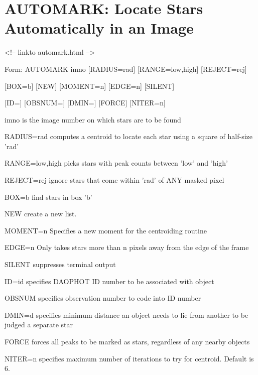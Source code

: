 \section{AUTOMARK: Locate Stars Automatically in an Image}
\begin{rawhtml}
<!-- linkto automark.html -->
\end{rawhtml}
\begin{command}
  \item[Form: AUTOMARK imno {[RADIUS=rad]} {[RANGE=low,high]} {[REJECT=rej]}\hfill]{}
  \item{{[BOX=b]} {[NEW]} {[MOMENT=n]} {[EDGE=n]} {[SILENT]}}
  \item{{[ID=]} {[OBSNUM=]} {[DMIN=]} {[FORCE]} {[NITER=n]}}
  \item[imno]{is the image number on which stars are
to be found}
  \item[RADIUS=rad]{computes a centroid to locate each star
using a square of half-size 'rad'}
  \item[RANGE=low,high]{picks stars with peak counts between 'low' and 'high'}
  \item[REJECT=rej]{ignore stars that come within 'rad' of
ANY masked pixel}
  \item[BOX=b]{find stars in box 'b'}
  \item[NEW]{create a new list.}
  \item[MOMENT=n]{Specifies a new moment for the centroiding routine}
  \item[EDGE=n]{Only takes stars more than n pixels away from the edge of the frame}
  \item[SILENT ]{suppresses terminal output}
  \item[ID=id]{specifies DAOPHOT ID number to be associated with object}
  \item[OBSNUM]{specifies observation number to code into ID number}
  \item[DMIN=d]{specifies minimum distance an object needs to
lie from another to be judged a separate star}
  \item[FORCE]{forces all peaks to be marked as stars,
regardless of any nearby objects}
  \item[NITER=n]{specifies maximum number of iterations to try for
centroid. Default is 6.}
\end{command}

